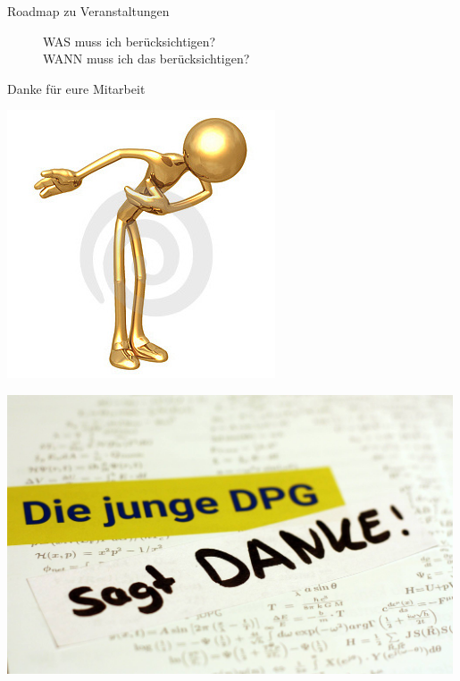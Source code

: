 \documentclass[
]{beamer}
\begin{document}
\begin{frame}{Roadmap zu Veranstaltungen}
  \begin{figure}
   \centering
	WAS muss ich berücksichtigen?\\
	WANN muss ich das berücksichtigen?
  \end{figure}
\end{frame}

\begin{frame}{Danke für eure Mitarbeit}
  \begin{minipage}[c]{0.35\textwidth}
    \includegraphics[]{figure/thank_you_1}
  \end{minipage}
  \hfill
  \begin{minipage}[c]{0.64\textwidth}
    \includegraphics[width=0.99\textwidth]{figure/20171206-Christina-Nolte-Merphi}
  \end{minipage}
\end{frame}
\end{document}
